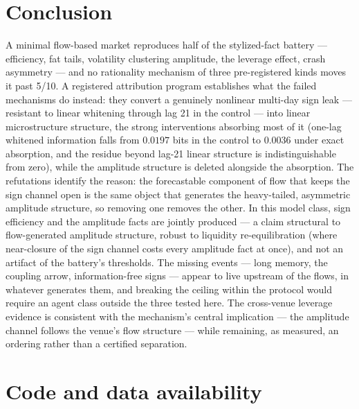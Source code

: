 \documentclass[11pt]{article}
\begin{document}
\section{Conclusion}
\label{sec:conclusion}

A minimal flow-based market reproduces half of the stylized-fact battery ---
efficiency, fat tails, volatility clustering amplitude, the leverage effect,
crash asymmetry --- and no rationality mechanism of three pre-registered
kinds moves it past 5/10. A registered attribution program establishes
what the failed mechanisms do instead: they convert a genuinely nonlinear
multi-day sign leak --- resistant to linear whitening through lag 21 in
the control --- into linear microstructure structure, the strong
interventions absorbing most
of it (one-lag whitened information falls from $0.0197$ bits in the
control to $0.0036$ under exact absorption, and the residue beyond
lag-21 linear structure is indistinguishable from zero), while the
amplitude structure is deleted alongside the absorption. The refutations
identify the reason: the
forecastable component of flow that keeps the sign channel open is the same
object that generates the heavy-tailed, asymmetric amplitude structure, so
removing one removes the other. In this model class, sign efficiency and
the amplitude facts are jointly produced --- a claim structural to
flow-generated amplitude structure, robust to liquidity re-equilibration
(where near-closure of the sign channel costs every amplitude fact at
once), and not an artifact of the battery's thresholds. The missing
events --- long
memory, the coupling arrow, information-free signs --- appear to live
upstream of the flows, in whatever generates them, and breaking the ceiling
within the protocol would require an agent class outside the three tested
here. The cross-venue leverage evidence is consistent with the mechanism's
central implication --- the amplitude channel follows the venue's flow
structure --- while remaining, as measured, an ordering rather than a
certified separation.

\section*{Code and data availability}
\label{sec:repro}
\end{document}
